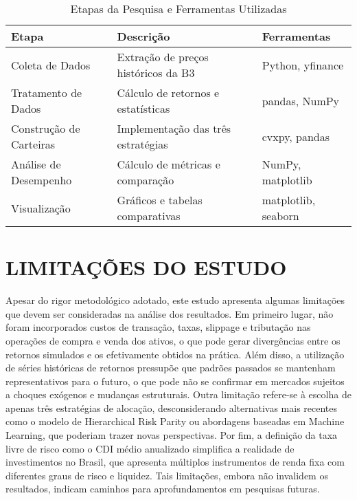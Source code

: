 \begin{table}[h]
\centering
\caption{Etapas da Pesquisa e Ferramentas Utilizadas}
\begin{tabular}{|p{4cm}|p{4cm}|p{4cm}|}
\hline
\textbf{Etapa} & \textbf{Descrição} & \textbf{Ferramentas} \\
\hline
Coleta de Dados & Extração de preços históricos da B3 & Python, yfinance \\
\hline
Tratamento de Dados & Cálculo de retornos e estatísticas & pandas, NumPy \\
\hline
Construção de Carteiras & Implementação das três estratégias & cvxpy, pandas \\
\hline
Análise de Desempenho & Cálculo de métricas e comparação & NumPy, matplotlib \\
\hline
Visualização & Gráficos e tabelas comparativas & matplotlib, seaborn \\
\hline
\end{tabular}
\label{tab:etapas_pesquisa}
\end{table}

\section{LIMITAÇÕES DO ESTUDO}

Apesar do rigor metodológico adotado, este estudo apresenta algumas limitações que devem ser consideradas na análise dos resultados. Em primeiro lugar, não foram incorporados custos de transação, taxas, slippage e tributação nas operações de compra e venda dos ativos, o que pode gerar divergências entre os retornos simulados e os efetivamente obtidos na prática. Além disso, a utilização de séries históricas de retornos pressupõe que padrões passados se mantenham representativos para o futuro, o que pode não se confirmar em mercados sujeitos a choques exógenos e mudanças estruturais. Outra limitação refere-se à escolha de apenas três estratégias de alocação, desconsiderando alternativas mais recentes como o modelo de Hierarchical Risk Parity ou abordagens baseadas em Machine Learning, que poderiam trazer novas perspectivas. Por fim, a definição da taxa livre de risco como o CDI médio anualizado simplifica a realidade de investimentos no Brasil, que apresenta múltiplos instrumentos de renda fixa com diferentes graus de risco e liquidez. Tais limitações, embora não invalidem os resultados, indicam caminhos para aprofundamentos em pesquisas futuras.